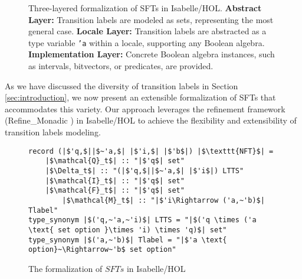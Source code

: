 \documentclass[sigplan,10pt,anonymous,review]{acmart}\settopmatter{printfolios=true,printccs=false,printacmref=false}
\begin{document}
\begin{figure}[hbt!]
\centering
{}
\caption{Three-layered formalization of SFTs in Isabelle/HOL. 
\textbf{Abstract Layer:} Transition labels are modeled as sets, representing the most general case.
\textbf{Locale Layer:} Transition labels are abstracted as a type variable \texttt{'a} within a locale, supporting any Boolean algebra.
\textbf{Implementation Layer:} Concrete Boolean algebra instances, such as intervals, bitvectors, or predicates, are provided.}
\label{fig:layered-formalization}
\end{figure}



As we have discussed the diversity of transition labels in Section \ref{sec:introduction}, we now present an extensible formalization of SFTs that accommodates this variety. Our approach leverages the refinement framework (Refine\_Monadic \cite{Refine_Monadic-AFP}) in Isabelle/HOL to achieve the flexibility and extensibility of transition labels modeling.

\begin{figure}[hbt!]
	\begin{lstlisting}
record (|$'q,$||$~'a,$| |$'i,$| |$'b$|) |$\texttt{NFT}$| =
	|$\mathcal{Q}_t$| :: "|$'q$| set"
	|$\Delta_t$| :: "(|$'q,$||$~'a,$| |$'i$|) LTTS"
	|$\mathcal{I}_t$| :: "|$'q$| set"
	|$\mathcal{F}_t$| :: "|$'q$| set"
        |$\mathcal{M}_t$| :: "|$'i\Rightarrow ('a,~'b)$| Tlabel"
type_synonym |$('q,~'a,~'i)$| LTTS = "|$('q \times ('a \text{ set option }\times 'i) \times 'q)$| set"
type_synonym |$('a,~'b)$| Tlabel = "|$'a \text{ option}~\Rightarrow~'b$ set option"
	\end{lstlisting}
\caption{The formalization of $SFTs$ in Isabelle/HOL}
\label{fig-def-FT}
\end{figure}
\end{document}
